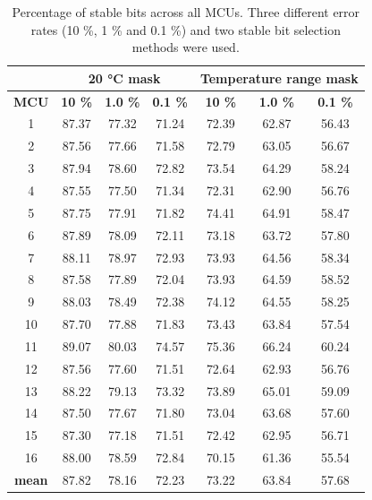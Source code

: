 \begin{table}[ht!]
    \centering
    \begin{tabular}{c||ccc|ccc}
    \multicolumn{1}{c}{} & \multicolumn{3}{c}{20 °C mask} & \multicolumn{3}{c}{Temperature range mask} \\
    \toprule
    \textbf{MCU} &  \textbf{10 \%} &  \textbf{1.0 \%} &  \textbf{0.1 \%} &  \textbf{10 \%} &  \textbf{1.0 \%} &  \textbf{0.1 \%} \\
    \midrule
    1    &   87.37 &  77.32 &  71.24 &    72.39 &   62.87 &   56.43 \\
    2    &   87.56 &  77.66 &  71.58 &    72.79 &   63.05 &   56.67 \\
    3    &   87.94 &  78.60 &  72.82 &    73.54 &   64.29 &   58.24 \\
    4    &   87.55 &  77.50 &  71.34 &    72.31 &   62.90 &   56.76 \\
    5    &   87.75 &  77.91 &  71.82 &    74.41 &   64.91 &   58.47 \\
    6    &   87.89 &  78.09 &  72.11 &    73.18 &   63.72 &   57.80 \\
    7    &   88.11 &  78.97 &  72.93 &    73.93 &   64.56 &   58.34 \\
    8    &   87.58 &  77.89 &  72.04 &    73.93 &   64.59 &   58.52 \\
    9    &   88.03 &  78.49 &  72.38 &    74.12 &   64.55 &   58.25 \\
    10   &   87.70 &  77.88 &  71.83 &    73.43 &   63.84 &   57.54 \\
    11   &   89.07 &  80.03 &  74.57 &    75.36 &   66.24 &   60.24 \\
    12   &   87.56 &  77.60 &  71.51 &    72.64 &   62.93 &   56.76 \\
    13   &   88.22 &  79.13 &  73.32 &    73.89 &   65.01 &   59.09 \\
    14   &   87.50 &  77.67 &  71.80 &    73.04 &   63.68 &   57.60 \\
    15   &   87.30 &  77.18 &  71.51 &    72.42 &   62.95 &   56.71 \\
    16   &   88.00 &  78.59 &  72.84 &    70.15 &   61.36 &   55.54 \\
    \textbf{mean} &   87.82 &  78.16 &  72.23 &    73.22 &   63.84 &   57.68 \\
    \bottomrule
    \end{tabular}
    \captionsetup{justification=centering,margin=0.5cm}
    \caption{Percentage of stable bits across all MCUs. Three different error rates (10 \%, 1 \% and 0.1 \%) and two stable bit selection methods were used.}
    \label{table:stable_bits}
\end{table}

